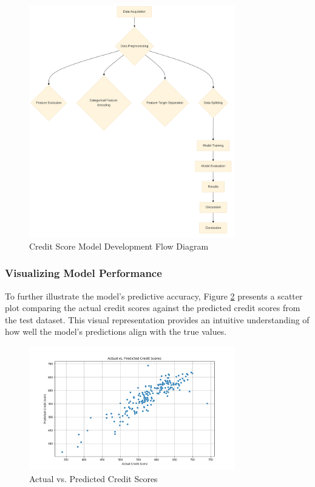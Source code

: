 \documentclass{article}
\begin{document}
\begin{figure}[h!]
    \centering
    \includegraphics[width=0.8\textwidth]{model_flow.png}
    \caption{Credit Score Model Development Flow Diagram}
    \label{fig:model_flow}
\end{figure}

\subsubsection{Visualizing Model Performance}

To further illustrate the model's predictive accuracy, Figure \ref{fig:actual_vs_predicted} presents a scatter plot comparing the actual credit scores against the predicted credit scores from the test dataset. This visual representation provides an intuitive understanding of how well the model's predictions align with the true values.

\begin{figure}[h!]
    \centering
    \includegraphics[width=0.8\textwidth]{actual_vs_predicted.png}
    \caption{Actual vs. Predicted Credit Scores}
    \label{fig:actual_vs_predicted}
\end{figure}
\end{document}
